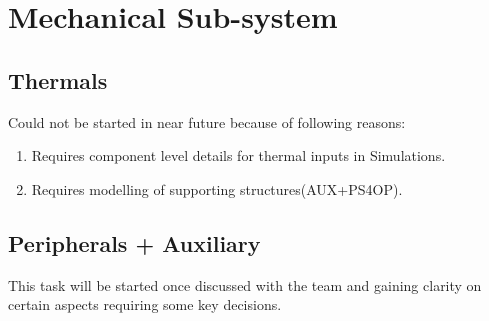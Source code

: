 \documentclass[../../main.tex]{subfiles}
\begin{document}
\chapter{Mechanical Sub-system}
\thispagestyle{fancy}

%
%
%
%












\section{Thermals}
\text Could not be started in near future because of following reasons:
\begin{enumerate}
    \item Requires component level details for thermal inputs in Simulations.
    \item Requires modelling of supporting structures(AUX+PS4OP).
\end{enumerate}


\section{Peripherals + Auxiliary} 
\text This task will be started once discussed with the team and gaining clarity on certain aspects requiring some key decisions.
\end{document}
